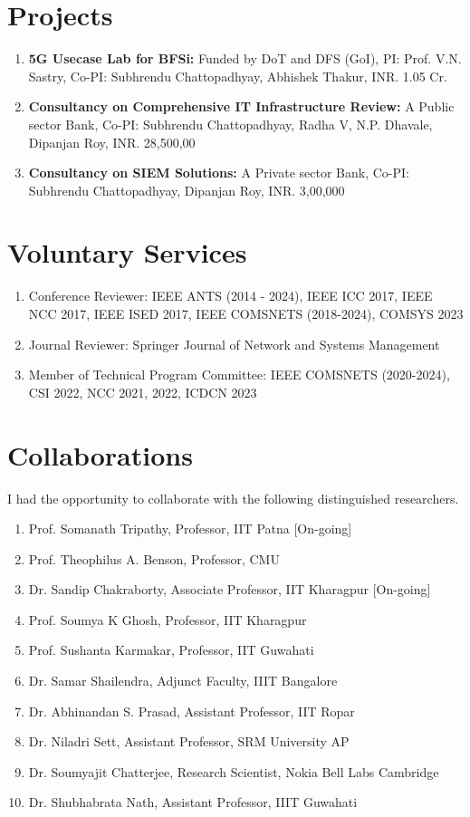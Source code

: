 \documentclass{article}
\begin{document}
\section{Projects}
	\begin{enumerate}
	 \item {\bf 5G Usecase Lab for BFSi:} Funded by DoT and DFS (GoI), PI: Prof. V.N. Sastry, Co-PI: Subhrendu Chattopadhyay, Abhishek Thakur, INR. 1.05 Cr.
	 \item {\bf Consultancy on Comprehensive IT Infrastructure Review:} A Public sector Bank, Co-PI: Subhrendu Chattopadhyay, Radha V, N.P. Dhavale, Dipanjan Roy, INR. 28,500,00
 	 \item {\bf Consultancy on SIEM Solutions:} A Private sector Bank, Co-PI: Subhrendu Chattopadhyay, Dipanjan Roy, INR. 3,00,000 
	\end{enumerate}
\section{Voluntary Services}
  \begin{enumerate}
   \item Conference Reviewer: IEEE ANTS (2014 - 2024), IEEE ICC 2017, IEEE NCC 2017, IEEE ISED 2017, IEEE COMSNETS (2018-2024), COMSYS 2023
   \item Journal Reviewer: Springer Journal of Network and Systems Management
   \item Member of Technical Program Committee: IEEE  COMSNETS (2020-2024), CSI 2022, NCC 2021, 2022, ICDCN 2023
  \end{enumerate}
\section{Collaborations}
I had the opportunity to collaborate with the following distinguished researchers.
  \begin{enumerate}
	\item Prof. Somanath Tripathy, Professor, IIT Patna [On-going]
  	\item Prof. Theophilus A. Benson, Professor, CMU
  	\item Dr. Sandip Chakraborty, Associate Professor, IIT Kharagpur [On-going]
	\item Prof. Soumya K Ghosh, Professor, IIT Kharagpur
	\item Prof. Sushanta Karmakar, Professor, IIT Guwahati
	\item Dr. Samar Shailendra, Adjunct Faculty, IIIT Bangalore
	\item Dr. Abhinandan S. Prasad, Assistant Professor, IIT Ropar
	\item Dr. Niladri Sett, Assistant Professor, SRM University AP
	\item Dr. Soumyajit Chatterjee, Research Scientist, Nokia Bell Labs Cambridge
	\item Dr. Shubhabrata Nath, Assistant Professor, IIIT Guwahati
  \end{enumerate}
\end{document}
